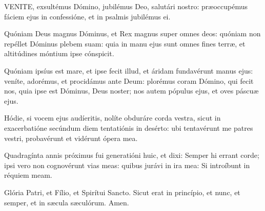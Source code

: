 

\lettrine[lines=2]{V}{ENITE}, exsultémus Dómino, jubilémus Deo, salutári nostro: præoccupémus fáciem ejus in confessióne, et in psalmis jubilémus ei.


Quóniam Deus magnus Dóminus, et Rex magnus super omnes deos: quóniam non repéllet Dóminus plebem suam: quia in manu ejus sunt omnes fines terræ, et altitúdines móntium ipse cónspicit.



Quóniam ipsíus est mare, et ipse fecit illud, et áridam fundavérunt manus ejus: veníte, adorémus, et procidámus ante Deum: plorémus coram Dómino, qui fecit nos, quia ipse est Dóminus, Deus noster; nos autem pópulus ejus, et oves páscuæ ejus.


Hódie, si vocem ejus audíeritis, nolíte obduráre corda vestra, sicut in exacerbatióne secúndum diem tentatiónis in desérto: ubi tentavérunt me patres vestri, probavérunt et vidérunt ópera mea.


Quadragínta annis próximus fui generatióni huic, et dixi: Semper hi errant corde; ipsi vero non cognovérunt vias meas: quibus jurávi in ira mea: Si introíbunt in réquiem meam.


Glória Patri, et Fílio, et Spirítui Sancto. Sicut erat in princípio, et nunc, et semper, et in sæcula sæculórum. Amen.






